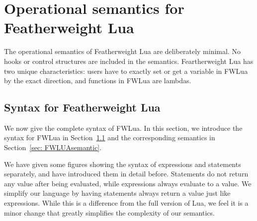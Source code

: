 \chapter{Operational semantics for Featherweight Lua} \label{chp: syntax and semantic}
The operational semantics of Featherweight Lua are deliberately minimal. No hooks or control structures are included in the semantics. Feartherweight Lua has two unique characteristics:
users have to exactly set or get a variable in FWLua by the exact direction, and functions in FWLua are lambdas.



\section{Syntax for Featherweight Lua}\label{sec: FWLUAsyntax}
We now give the complete syntax of FWLua. In this section, we introduce the syntax for FWLua in Section~\ref{sec: FWLUAsyntax} and the corresponding semantics in Section~\ref{sec: FWLUAsemantic}.

We have given some figures showing the syntax of expressions and statements separately, and have introduced them in detail before.
Statements do not return any value after being evaluated, while expressions always evaluate to a value.
We simplify our language by
having statements always return a value just like expressions.
While this is a difference from the full version of Lua,
we feel it is a minor change that greatly simplifies the complexity
of our semantics.

